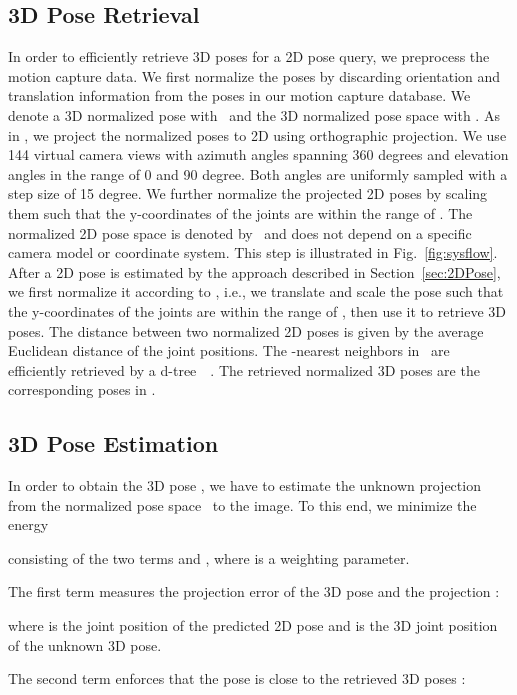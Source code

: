 \documentclass[10pt,journal,compsoc]{IEEEtran}
\makeatletter
\newcommand*{\ie}{i.e.\@\xspace}
\newcommand{\kdtree}{d-tree~}
\newcommand{\nspacet}{\mbox{}}
\newcommand{\nspace}{\mbox{}}
\makeatother
\begin{document}
\subsection{3D Pose Retrieval}\label{sec:similarity}
In order to efficiently retrieve 3D poses for a 2D pose query, we preprocess the motion capture data.
We first normalize the poses by discarding orientation and translation information from the poses in our
motion capture database. We denote a 3D normalized pose with \ptdn~and the 3D normalized pose space with \nspacet.
As in \cite{yasin-2013}, we project the normalized poses  to 2D using orthographic projection.
We use 144 virtual camera views with azimuth angles spanning 360 degrees and elevation angles in the range of 0 and
90 degree. Both angles are uniformly sampled with a step size of 15 degree. We further normalize the projected 2D 
poses by scaling them such that the y-coordinates of the joints are within the range of .
The normalized 2D pose space is denoted by \nspace\ and does not depend on a specific camera model
or coordinate system. This step is illustrated in Fig.~\ref{fig:sysflow}. After a 2D pose is estimated by the 
approach described in Section~\ref{sec:2DPose}, we first normalize it according to \nspace, \ie, we 
translate and scale the pose such that the y-coordinates of the joints are within the range of ,  
then use it to retrieve 3D poses. The distance between two normalized 2D poses is given by the average Euclidean distance
of the joint positions. The -nearest neighbors in \nspace\ are efficiently retrieved by a
\kdtree~\cite{krueger-2010}. The retrieved normalized 3D poses are the corresponding poses in \nspacet. 

\subsection{3D Pose Estimation}\label{sec:posrec}
In order to obtain the 3D pose , we have to estimate the unknown projection 
 from the normalized pose space \nspacet\ to the image. To this end, we minimize the energy

consisting of the two terms  and , where  is a weighting parameter. 

The first term  measures the projection error of the 3D pose  and the projection :

where  is the joint position of the predicted 2D pose and  is the 3D joint position of the unknown 3D pose.

The second term enforces that the pose  is close to the retrieved 3D poses :
\end{document}
